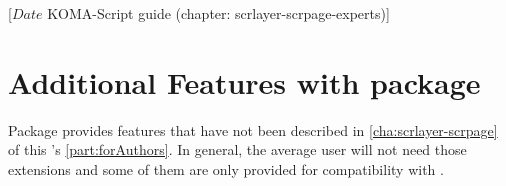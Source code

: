 %
%
%
%
%
%
%
%
% 
%
%
%
%

%
                 [$Date$
                  KOMA-Script guide (chapter: scrlayer-scrpage-experts)]


\chapter[{Additional Features of \Package{scrlayer-scrpage}}]
  {Additional Features with
    package }
%
%
Package  provides features that have not been
described in \autoref{cha:scrlayer-scrpage} of this 's \autoref{part:forAuthors}. In general, the average user will
not need those extensions and some of them are only provided for
compatibility with .

